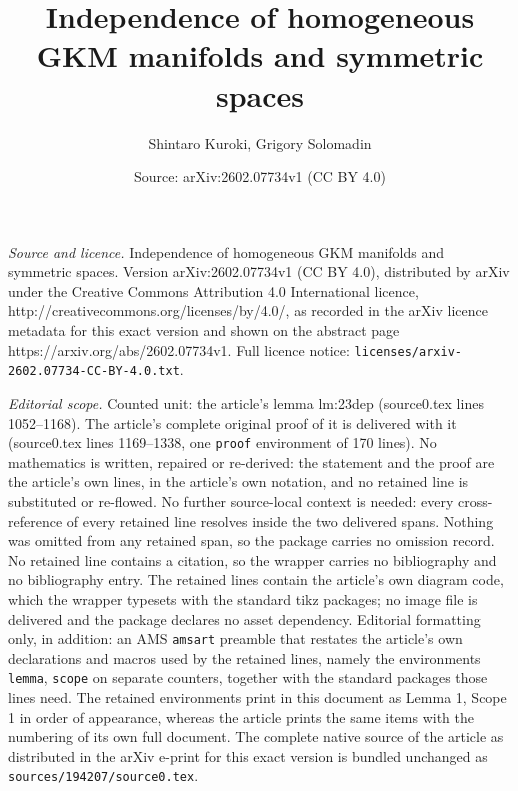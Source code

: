 \documentclass[10pt,a4paper]{amsart}
\title{Independence of homogeneous GKM manifolds and symmetric spaces}
\author{Shintaro Kuroki, Grigory Solomadin}
\date{Source: arXiv:2602.07734v1 (CC BY 4.0)}
\begin{document}
\maketitle

\noindent\emph{Source and licence.} Independence of homogeneous GKM manifolds and symmetric spaces. Version arXiv:2602.07734v1 (CC BY 4.0), distributed by arXiv under the Creative Commons Attribution 4.0 International licence, http://creativecommons.org/licenses/by/4.0/, as recorded in the arXiv licence metadata for this exact version and shown on the abstract page https://arxiv.org/abs/2602.07734v1. Full licence notice: \texttt{licenses/arxiv-2602.07734-CC-BY-4.0.txt}.\par\smallskip

\noindent\textit{Editorial scope.} Counted unit: the article's lemma lm:23dep (source0.tex lines 1052--1168). The article's complete original proof of it is delivered with it (source0.tex lines 1169--1338, one \texttt{proof} environment of 170 lines). No mathematics is written, repaired or re-derived: the statement and the proof are the article's own lines, in the article's own notation, and no retained line is substituted or re-flowed.  No further source-local context is needed: every cross-reference of every retained line resolves inside the two delivered spans.  Nothing was omitted from any retained span, so the package carries no omission record.  No retained line contains a citation, so the wrapper carries no bibliography and no bibliography entry.  The retained lines contain the article's own diagram code, which the wrapper typesets with the standard tikz packages; no image file is delivered and the package declares no asset dependency.  Editorial formatting only, in addition: an AMS \texttt{amsart} preamble that restates the article's own declarations and macros used by the retained lines, namely the environments \texttt{lemma}, \texttt{scope} on separate counters, together with the standard packages those lines need.  The retained environments print in this document as Lemma 1, Scope 1 in order of appearance, whereas the article prints the same items with the numbering of its own full document.  The complete native source of the article as distributed in the arXiv e-print for this exact version is bundled unchanged as \texttt{sources/194207/source0.tex}.
\end{document}

